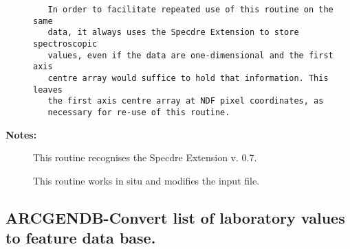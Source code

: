 \begin{description}
\begin{verbatim}
   In order to facilitate repeated use of this routine on the same
   data, it always uses the Specdre Extension to store spectroscopic
   values, even if the data are one-dimensional and the first axis
   centre array would suffice to hold that information. This leaves
   the first axis centre array at NDF pixel coordinates, as
   necessary for re-use of this routine.

\end{verbatim}

\item [{\bf Notes:}]
This routine recognises the Specdre Extension v. 0.7.

This routine works in situ and modifies the input file.

\end{description}
\subsection{ARCGENDB-\label{ARCGENDB}Convert list of laboratory values to feature data base.}
